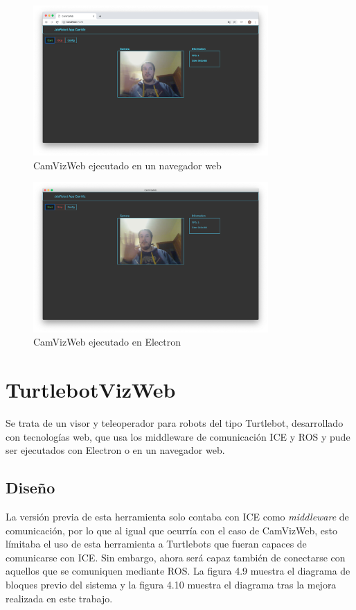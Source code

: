 \begin{figure}[H]
  \begin{center}
    \includegraphics[width=0.8\textwidth]{figures/camviznode.png}
    		\caption{CamVizWeb ejecutado en un navegador web}
		\label{fig.camviznode}
		\end{center}
\end{figure}
\begin{figure}[H]
  \begin{center}
    \includegraphics[width=0.8\textwidth]{figures/camvizelectron.png}
    		\caption{CamVizWeb ejecutado en Electron}
		\label{fig.camvizelectron}
		\end{center}
\end{figure}

\section{TurtlebotVizWeb}
Se trata de un visor y teleoperador para robots del tipo Turtlebot, desarrollado con tecnologías web, que usa los middleware de comunicación ICE y ROS y pude ser ejecutados con Electron o en un navegador web.

\subsection{Diseño}
La versión previa de esta herramienta solo contaba con ICE como \textit{middleware} de comunicación, por lo que al igual que ocurría con el caso de CamVizWeb, esto límitaba el uso de esta herramienta a Turtlebots que fueran capaces de comunicarse con ICE. Sin embargo, ahora será capaz también de conectarse con aquellos que se comuniquen mediante ROS. La figura 4.9 muestra el diagrama de bloques previo del sistema y la figura 4.10 muestra el diagrama tras la mejora realizada en este trabajo.

